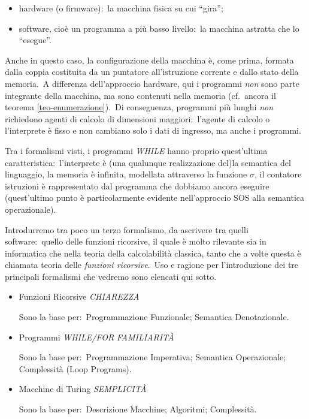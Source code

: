 \begin{itemize}
    \item hardware (o firmware):\ la macchina fisica su cui ``gira'';
    \item software, cioè un programma a più basso livello:\ la macchina astratta che lo ``esegue''.
\end{itemize}

\noindent Anche in questo caso, la configurazione della macchina è, come prima, formata dalla coppia costituita da un puntatore all'istruzione corrente e dallo stato della memoria.\
A differenza dell'approccio hardware, qui i programmi \textit{non} sono parte integrante della macchina, ma sono contenuti nella memoria (cf.\ ancora il teorema \ref{teo-enumerazione}).\
Di conseguenza, programmi più lunghi \textit{non} richiedono agenti di calcolo di dimensioni maggiori:\ l'agente di calcolo o l'interprete è fisso e non cambiano solo i dati di ingresso, ma anche i programmi.\

Tra i formalismi visti, i programmi \textit{\footnotesize WHILE} hanno proprio quest'ultima
caratteristica:\ l'interprete è (una qualunque realizzazione del)la semantica del linguaggio, la memoria è infinita, modellata attraverso la funzione $\sigma$, il contatore istruzioni è rappresentato dal programma che dobbiamo ancora eseguire (quest'ultimo punto è particolarmente evidente nell'approccio SOS alla semantica operazionale).\

Introdurremo tra poco un terzo formalismo, da ascrivere tra quelli software:\ quello delle funzioni ricorsive, il quale è molto rilevante sia in informatica che nella teoria della calcolabilità classica, tanto che a volte questa è chiamata teoria delle \textit{funzioni ricorsive}.\
Uso e ragione per l'introduzione dei tre principali formalismi che vedremo sono elencati qui sotto.

\begin{itemize}
    \item Funzioni Ricorsive \hfill \textit{\footnotesize CHIAREZZA}

          Sono la base per:\ Programmazione Funzionale; Semantica Denotazionale.

    \item Programmi \textit{\footnotesize WHILE/FOR} \hfill \textit{\footnotesize FAMILIARITÀ}

          Sono la base per:\ Programmazione Imperativa; Semantica Operazionale; Complessità (Loop Programs).

    \item  Macchine di Turing \hfill \textit{\footnotesize SEMPLICITÀ}

          Sono la base per:\ Descrizione Macchine; Algoritmi; Complessità.
\end{itemize}

